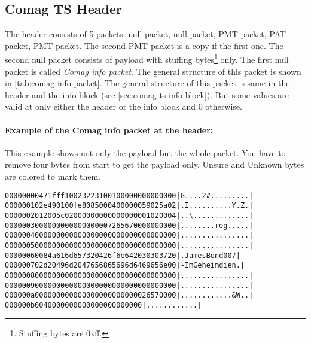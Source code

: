 \documentclass{scrartcl}
\begin{document}
\subsection{Comag TS Header}
\label{sec:comag-ts-header}

The header consists of 5 packets: null packet, null packet, PMT packet, PAT
packet, PMT packet. The second PMT packet is a copy if the first one. The
second null packet consists of payload with stuffing bytes\footnote{Stuffing
  bytes are 0xff.} only. The first null packet is called \emph{Comag info
  packet}. The general structure of this packet is shown in
\autoref{tab:comag-info-packet}. The general structure of this packet is same
in the header and the info block (see \autoref{sec:comag-ts-info-block}). But
some values are valid at only either the header or the info block and 0
otherwise.

\paragraph{Example of the Comag info packet at the header:} This example shows
not only the payload but the whole packet. You have to remove four bytes from
start to get the payload only. \textcolor{unsure}{Unsure} and
\textcolor{unknown}{Unknown} bytes are colored to mark them.

{\small
\begin{alltt}
00000000  47 1f ff 10 \textcolor{unsure}{02 32 23 10  01} 00 00 00 00 00 00 00  |G....2\#.........|
00000010  2e 49 01 00 fe 80 85 00  04 00 00 00 59 02 5a 02  |.I..........Y.Z.|
00000020  12 00 5c 02 00 00 00 00  00 00 00 00 01 02 00 04  |..\textbackslash.............|
00000030  00 00 00 00 00 00 00 00  72 65 67 00 00 00 00 00  |........reg.....|
00000040  00 00 00 00 00 00 00 00  00 00 00 00 00 00 00 00  |................|
00000050  00 00 00 00 00 00 00 00  00 00 00 00 00 00 00 00  |................|
00000060  08 4a 61 6d 65 73 20 42  6f 6e 64 20 30 30 37 20  |.James Bond 007 |
00000070  2d 20 49 6d 20 47 65 68  65 69 6d 64 69 65 6e 00  |- Im Geheimdien.|
00000080  00 00 00 00 00 00 00 00  00 00 00 00 00 00 00 00  |................|
00000090  00 00 00 00 00 00 00 00  00 00 00 00 00 00 00 00  |................|
000000a0  00 00 00 00 00 00 00 00  00 00 00 00 26 57 00 00  |............\&W..|
000000b0  04 00 00 00 00 00 00 00  00 00 00 00              |............|
\end{alltt}
}
\end{document}
